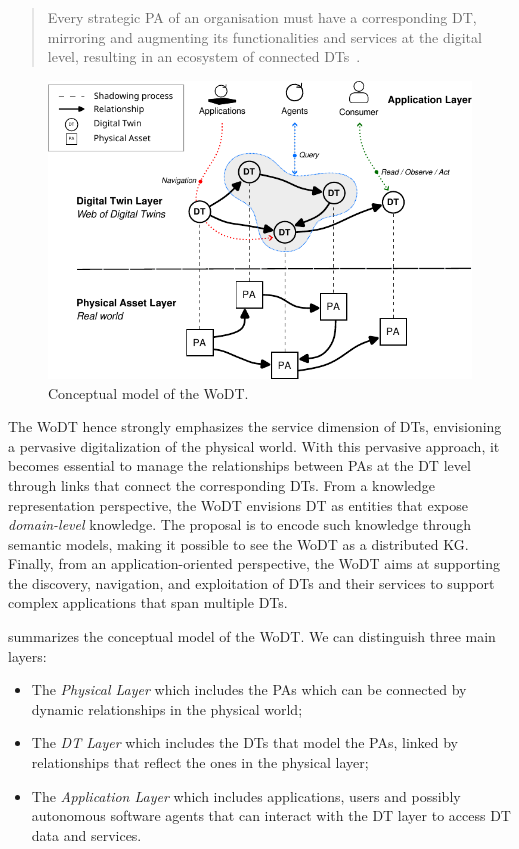 \begin{quote}
Every strategic \acl{PA} of an organisation must have a corresponding \acl{DT}, mirroring and augmenting its functionalities and services at the digital level, resulting in an ecosystem of connected \aclp{DT}~\cite{web-of-dt-ricci-2022}.
\end{quote}

\begin{figure}[ht]
    \centering
    \includegraphics[width=\textwidth]{figures/wodt.pdf}
    \caption{Conceptual model of the \acl{WoDT}.}
    \label{fig:dt-wodt-model}
\end{figure}

The \ac{WoDT} hence strongly emphasizes the service dimension of \acp{DT}, envisioning a pervasive digitalization of the physical world.
%
With this pervasive approach, it becomes essential to manage the relationships between \acp{PA} at the \ac{DT} level through links that connect the corresponding \acp{DT}.
%
From a knowledge representation perspective, the \ac{WoDT} envisions \ac{DT} as entities that expose \emph{domain-level} knowledge.
%
The proposal is to encode such knowledge through semantic models, making it possible to see the \ac{WoDT} as a distributed \ac{KG}.
%
Finally, from an application-oriented perspective, the \ac{WoDT} aims at supporting the discovery, navigation, and exploitation of \acp{DT} and their services to support complex applications that span multiple \acp{DT}.

 summarizes the conceptual model of the \ac{WoDT}.
%
We can distinguish three main layers:
\begin{itemize}
    \item The \emph{Physical Layer} which includes the \acp{PA} which can be connected by dynamic relationships in the physical world;
    \item The \emph{\acl{DT} Layer} which includes the \acp{DT} that model the \acp{PA}, linked by relationships that reflect the ones in the physical layer;
    \item The \emph{Application Layer} which includes applications, users and possibly autonomous software agents that can interact with the \ac{DT} layer to access \ac{DT} data and services.
\end{itemize}

